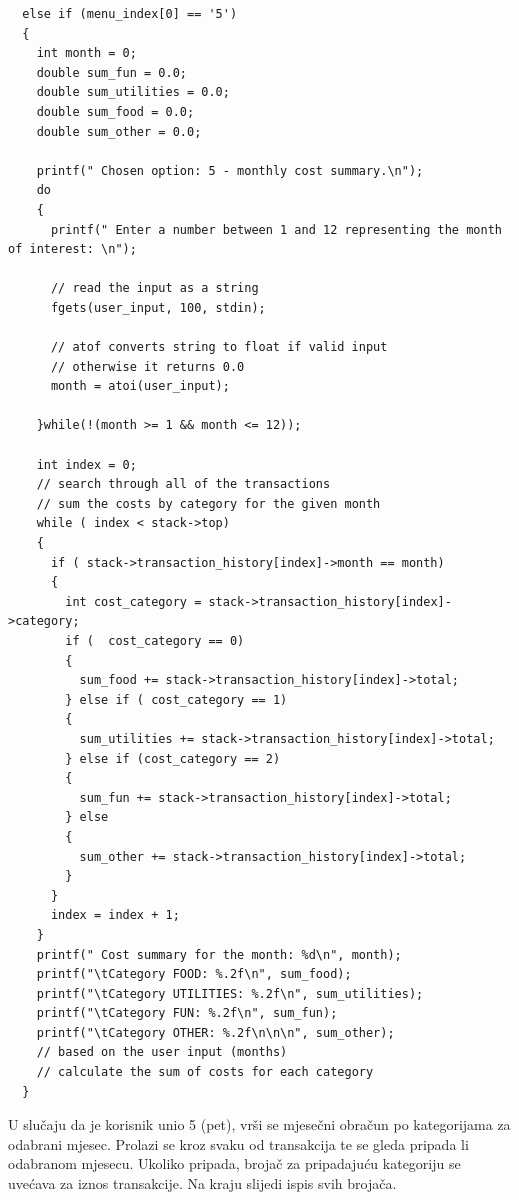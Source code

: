\documentclass[12pt, letterpaper]{article}
\begin{document}
  \begin{verbatim}
  else if (menu_index[0] == '5')
  {
    int month = 0;
    double sum_fun = 0.0;
    double sum_utilities = 0.0;
    double sum_food = 0.0;
    double sum_other = 0.0;

    printf(" Chosen option: 5 - monthly cost summary.\n");
    do
    {
      printf(" Enter a number between 1 and 12 representing the month of interest: \n");

      // read the input as a string
      fgets(user_input, 100, stdin);  

      // atof converts string to float if valid input
      // otherwise it returns 0.0
      month = atoi(user_input);

    }while(!(month >= 1 && month <= 12));

    int index = 0;
    // search through all of the transactions
    // sum the costs by category for the given month
    while ( index < stack->top)
    {
      if ( stack->transaction_history[index]->month == month)
      {
        int cost_category = stack->transaction_history[index]->category;
        if (  cost_category == 0)
        {
          sum_food += stack->transaction_history[index]->total;
        } else if ( cost_category == 1)
        {
          sum_utilities += stack->transaction_history[index]->total;
        } else if (cost_category == 2)
        {
          sum_fun += stack->transaction_history[index]->total;
        } else
        {
          sum_other += stack->transaction_history[index]->total;
        }
      }
      index = index + 1;
    }
    printf(" Cost summary for the month: %d\n", month);
    printf("\tCategory FOOD: %.2f\n", sum_food);
    printf("\tCategory UTILITIES: %.2f\n", sum_utilities);
    printf("\tCategory FUN: %.2f\n", sum_fun);
    printf("\tCategory OTHER: %.2f\n\n\n", sum_other);
    // based on the user input (months)
    // calculate the sum of costs for each category
  }
  \end{verbatim}
  U slučaju da je korisnik unio 5 (pet), vrši se mjesečni obračun po kategorijama za odabrani mjesec. Prolazi se kroz svaku od transakcija te se gleda pripada li odabranom mjesecu. Ukoliko pripada, brojač za pripadajuću kategoriju se uvećava za iznos transakcije. Na kraju slijedi ispis svih brojača.
\end{document}
